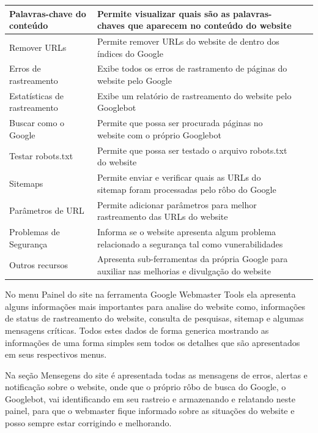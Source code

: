 \documentclass[
	12pt,				%
	openright,			%
	twoside,			%
	a4paper,			%
	english,			%
	french,				%
	spanish,			%
	brazil				%
	]{abntex2}
\begin{document}
\begin{table}[htb]
\begin{center}
\begin{tabular}{p{2.6cm}|p{6.0cm}|p{2.25cm}|p{3.40cm}}
    \hline
    Palavras-chave do conteúdo & Permite visualizar quais são as palavras-chaves que aparecem no conteúdo do website \\
    \hline
    Remover URLs & Permite remover URLs do website de dentro dos índices do Google \\
    \hline
    Erros de rastreamento & Exibe todos os erros de rastramento de páginas do website pelo Google \\
    \hline
    Estatísticas de rastreamento & Exibe um relatório de rastreamento do website pelo Googlebot \\
    \hline
    Buscar como o Google & Permite que possa ser procurada páginas no website com o próprio Googlebot \\
    \hline
    Testar robots.txt & Permite que possa ser testado o arquivo robots.txt do website \\
    \hline
    Sitemaps & Permite enviar e verificar quais as URLs do sitemap foram processadas pelo rôbo do Google \\
    \hline
    Parâmetros de URL & Permite adicionar parâmetros para melhor rastreamento das URLs do website \\
    \hline
    Problemas de Segurança & Informa se o website apresenta algum problema relacionado a segurança tal como vunerabilidades \\
    \hline
    Outros recursos & Apresenta sub-ferramentas da própria Google para auxiliar nas melhorias e divulgação do website \\
\end{tabular}
\end{center}
\end{table}

No menu Painel do site na ferramenta Google Webmaster Tools ela apresenta alguns informações mais importantes para analise do website como,  informações de status de rastreamento do website, consulta de pesquisas, sitemap e algumas mensagens críticas. Todos estes dados de forma generica mostrando as informações de uma forma simples sem todos os detalhes que são apresentados em seus respectivos menus.

Na seção Mensegens do site é apresentada todas as mensagens de erros, alertas e notificação sobre o website, onde que o próprio rôbo de busca do Google, o Googlebot, vai identificando em seu rastreio e armazenando e relatando neste painel, para que o webmaster fique informado sobre as situações do website e posso sempre estar corrigindo e melhorando.
\end{document}
